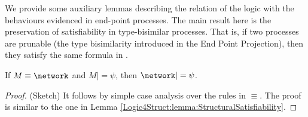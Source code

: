 We provide some auxiliary lemmas describing the relation of the logic
with the behaviours evidenced in end-point processes. The main result
here is the preservation of satisfiability in type-bisimilar
processes. That is, if two processes are prunable (the type
bisimilarity introduced in the End Point Projection), then they
satisfy the same formula in \LL.


\begin{lemma}
  \label{Logic4Struct:lemma:StructuralSatisfiability-local} If $M\equiv\network$ and
  $M |= \psi$, then $\network |= \psi$.
\end{lemma}
\begin{proof}(Sketch)
  It follows by simple case analysis over the rules in $\equiv$. The
  proof is similar to the one in Lemma \ref{Logic4Struct:lemma:StructuralSatisfiability}.
\end{proof}

%

